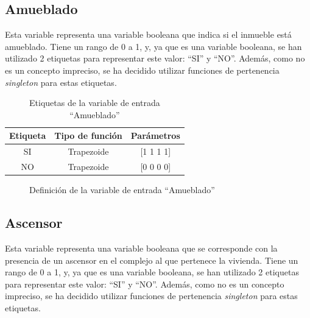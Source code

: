 \documentclass[12pt]{report} %
\begin{document}
        \subsection{Amueblado}
        Esta variable representa una variable booleana que indica si el inmueble está amueblado.
        Tiene un rango de 0 a 1, y, ya que es una variable booleana, se han utilizado 2 etiquetas para representar este valor: ``SI'' y ``NO''.
        Además, como no es un concepto impreciso, se ha decidido utilizar funciones de pertenencia \textit{singleton} para estas etiquetas.

        \begin{table}[h]
            \center
            \begin{tabular}{@{}ccc@{}}
                \toprule
                \textbf{Etiqueta} & \textbf{Tipo de función} & \textbf{Parámetros} \\
                \midrule
                SI & Trapezoide & [1 1 1 1] \\
                NO & Trapezoide & [0 0 0 0] \\
                \bottomrule
            \end{tabular}
            \caption{Etiquetas de la variable de entrada ``Amueblado''}
        \end{table}

        \begin{figure}[H]
            \centering
            \caption{Definición de la variable de entrada ``Amueblado''}
        \end{figure}

        \subsection{Ascensor}
        Esta variable representa una variable booleana que se corresponde con la presencia de un ascensor en el complejo al que pertenece la vivienda. 
        Tiene un rango de 0 a 1, y, ya que es una variable booleana, se han utilizado 2 etiquetas para representar este valor: ``SI'' y ``NO''.
        Además, como no es un concepto impreciso, se ha decidido utilizar funciones de pertenencia \textit{singleton} para estas etiquetas.
\end{document}

